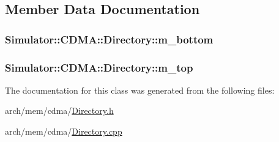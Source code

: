 \subsection{Member Data Documentation}
\hypertarget{class_simulator_1_1_c_d_m_a_1_1_directory_aae0350e5c0dc2fa299d1d5856d8a69fe}{
\subsubsection[{m\+\_\+bottom}]{ Simulator\+::\+C\+D\+M\+A\+::\+Directory\+::m\+\_\+bottom\hspace{0.3cm}{\ttfamily [protected]}}}\label{class_simulator_1_1_c_d_m_a_1_1_directory_aae0350e5c0dc2fa299d1d5856d8a69fe}
\hypertarget{class_simulator_1_1_c_d_m_a_1_1_directory_ae8ed427dc5c89c0919f77710cad0a53c}{
\subsubsection[{m\+\_\+top}]{ Simulator\+::\+C\+D\+M\+A\+::\+Directory\+::m\+\_\+top\hspace{0.3cm}{\ttfamily [protected]}}}\label{class_simulator_1_1_c_d_m_a_1_1_directory_ae8ed427dc5c89c0919f77710cad0a53c}


The documentation for this class was generated from the following files\+:\begin{DoxyCompactItemize}
\item 
arch/mem/cdma/\hyperlink{cdma_2_directory_8h}{Directory.\+h}\item 
arch/mem/cdma/\hyperlink{cdma_2_directory_8cpp}{Directory.\+cpp}\end{DoxyCompactItemize}
